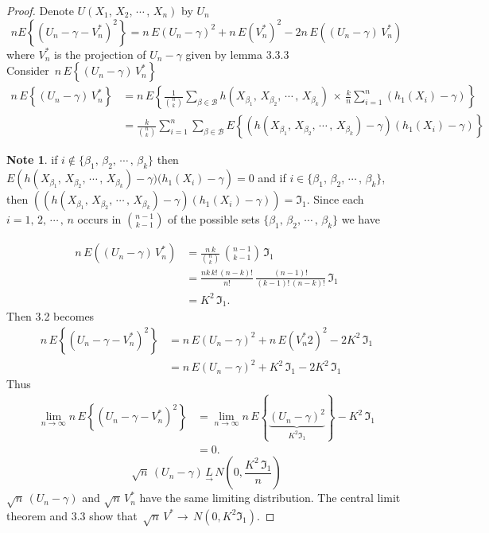 \documentclass[12pt,a4paper]{report}
\theoremstyle{definition}
\newtheorem{note}[thm]{Note}
\theoremstyle{plain}
\begin{document}
\begin{proof}
Denote $U(X_1, \, X_2, \, \cdots\, , \, X_n)$ by $U_n$
\begin{equation}
nE\left\{(U_n - \gamma - V^*_n)^2\right\} = n\, E\left(U_n - \gamma\right)^2 + n\, E\left(V^*_n\right)^2 - 2n\, E\left((U_n - \gamma)\, V^*_n\right)
\end{equation}
where $V^*_n$ is the projection of $U_n - \gamma$ given by lemma 3.3.3\\

Consider $\, n\, E\left\{(U_n - \gamma)\, V^*_n\right\}$
\begin{align*}
n\, E\left\{(U_n - \gamma)\, V^*_n\right\} & = n\, E\left\{\frac{1}{\binom{n}{k}}\sum_{\beta\in\mathcal{B}}h(X_{\beta_1}, \, X_{\beta_2}, \, \cdots\, , \, X_{\beta_k})\,\times\, \frac{k}{n}\sum^n_{i = 1} (h_1(X_i) - \gamma)\right\}\\
& = \frac{k}{\binom{n}{k}}\sum^n_{i = 1}\sum_{\beta\in\mathcal{B}} E\left\{(h(X_{\beta_1}, \, X_{\beta_2}, \, \cdots\, , \, X_{\beta_k})-\gamma)(h_1(X_i) - \gamma)\right\}
\end{align*}
\begin{note}
if $i \not\in\{\beta_1, \, \beta_2, \, \cdots\,, \, \beta_k\}$ then $E\left(h(X_{\beta_1}, \, X_{\beta_2}, \, \cdots\, , \, X_{\beta_k}) - \gamma)(h_1(X_i) - \gamma\right) = 0$ and if $i\in \{\beta_1, \, \beta_2, \, \cdots\, , \, \beta_k\}$, then  $\left((h(X_{\beta_1}, \, X_{\beta_2}, \, \cdots\, , \, X_{\beta_k}) -\gamma)(h_1(X_i) - \gamma)\right)  = \Im_1$. Since each $i = 1, \, 2,\, \cdots\,  ,\, n$ occurs in $\binom{n - 1}{k - 1}$ of the possible sets $\{\beta_1, \, \beta_2, \, \cdots\, , \, \beta_k\}$ we have 
\end{note}
\begin{align*}
n\, E\left((U_n - \gamma) \, V_n^*\right) & = \frac{n\, k}{\binom{n}{k}}\, \binom{n - 1}{k - 1}\, \Im_1\\
& = \frac{nk\, k!\, (n-k)!}{n!}\, \frac{(n-1)!}{(k- 1)!\, (n - k)!}\, \Im_1\\
& = K^2\, \Im_1.
\end{align*}
Then 3.2 becomes
\begin{align*}
n\, E\left\{(U_n - \gamma - V^*_n)^2\right\} & = n\, E\left(U_n - \gamma\right)^2 + n\, E\left(V^*_n2\right)^2 - 2K^2\, \Im_1\\
& = n\, E\left(U_n - \gamma\right)^2 + K^2\, \Im_1 - 2K^2\, \Im_1
\end{align*}
Thus
\begin{align*}
\lim_{n\rightarrow \infty} n\, E\left\{(U_n - \gamma - V^*_n)^2\right\} & =\lim_{n\rightarrow\infty} n\, E\left\{\underbrace{\left(U_n - \gamma\right)^2}_{K^2\Im_1}\right\} - K^2\, \Im_1\\
& = 0.
\end{align*}
\begin{equation}
\sqrt{n}\, (U_n - \gamma) \, \underset{\longrightarrow}{L} \, N\left(0, \frac{K^2\, \Im_1}{n}\right)
\end{equation}
$\sqrt{n}\, (U_n - \gamma)$ and $\sqrt{n}\, V^*_n$ have the same limiting distribution. The central limit theorem and 3.3 show that $\, \sqrt{n}\, V^* \longrightarrow\, N(0,K^2\Im_1)$.
\end{proof}
\end{document}
